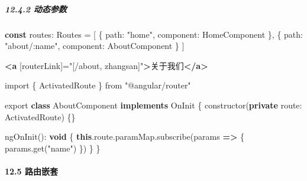 \documentclass[
]{article}
\newenvironment{Shaded}{}{}
\newcommand{\AttributeTok}[1]{\textcolor[rgb]{0.49,0.56,0.16}{#1}}
\newcommand{\DataTypeTok}[1]{\textcolor[rgb]{0.56,0.13,0.00}{#1}}
\newcommand{\FunctionTok}[1]{\textcolor[rgb]{0.02,0.16,0.49}{#1}}
\newcommand{\ImportTok}[1]{#1}
\newcommand{\KeywordTok}[1]{\textcolor[rgb]{0.00,0.44,0.13}{\textbf{#1}}}
\newcommand{\NormalTok}[1]{#1}
\newcommand{\OperatorTok}[1]{\textcolor[rgb]{0.40,0.40,0.40}{#1}}
\newcommand{\OtherTok}[1]{\textcolor[rgb]{0.00,0.44,0.13}{#1}}
\newcommand{\StringTok}[1]{\textcolor[rgb]{0.25,0.44,0.63}{#1}}
\begin{document}
\hypertarget{1242-ux52a8ux6001ux53c2ux6570}{%
\subparagraph{12.4.2 动态参数}\label{1242-ux52a8ux6001ux53c2ux6570}}

\begin{Shaded}
\begin{Highlighting}[]
\KeywordTok{const}\NormalTok{ routes}\OperatorTok{:}\NormalTok{ Routes }\OperatorTok{=}\NormalTok{ [}
\NormalTok{  \{}
    \DataTypeTok{path}\OperatorTok{:} \StringTok{"home"}\OperatorTok{,}
    \DataTypeTok{component}\OperatorTok{:}\NormalTok{ HomeComponent}
\NormalTok{  \}}\OperatorTok{,}
\NormalTok{  \{}
    \DataTypeTok{path}\OperatorTok{:} \StringTok{"about/:name"}\OperatorTok{,}
    \DataTypeTok{component}\OperatorTok{:}\NormalTok{ AboutComponent}
\NormalTok{  \}}
\NormalTok{]}
\end{Highlighting}
\end{Shaded}

\begin{Shaded}
\begin{Highlighting}[]
\KeywordTok{\textless{}a}\OtherTok{ [routerLink]=}\StringTok{"[\textquotesingle{}/about\textquotesingle{}, \textquotesingle{}zhangsan\textquotesingle{}]"}\KeywordTok{\textgreater{}}\NormalTok{关于我们}\KeywordTok{\textless{}/a\textgreater{}}
\end{Highlighting}
\end{Shaded}

\begin{Shaded}
\begin{Highlighting}[]
\ImportTok{import}\NormalTok{ \{ ActivatedRoute \} }\ImportTok{from} \StringTok{"@angular/router"}

\ImportTok{export} \KeywordTok{class}\NormalTok{ AboutComponent }\KeywordTok{implements}\NormalTok{ OnInit \{}
  \FunctionTok{constructor}\NormalTok{(}\KeywordTok{private} \DataTypeTok{route}\OperatorTok{:}\NormalTok{ ActivatedRoute) \{\}}

  \FunctionTok{ngOnInit}\NormalTok{()}\OperatorTok{:} \KeywordTok{void}\NormalTok{ \{}
    \KeywordTok{this}\OperatorTok{.}\AttributeTok{route}\OperatorTok{.}\AttributeTok{paramMap}\OperatorTok{.}\FunctionTok{subscribe}\NormalTok{(params }\KeywordTok{=\textgreater{}}\NormalTok{ \{}
\NormalTok{      params}\OperatorTok{.}\FunctionTok{get}\NormalTok{(}\StringTok{"name"}\NormalTok{)}
\NormalTok{    \})}
\NormalTok{  \}}
\NormalTok{\}}
\end{Highlighting}
\end{Shaded}

\hypertarget{125-ux8defux7531ux5d4cux5957}{%
\paragraph{12.5 路由嵌套}\label{125-ux8defux7531ux5d4cux5957}}
\end{document}
